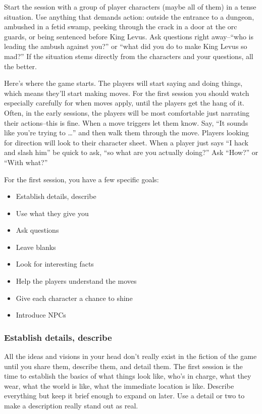 Start the session with a group of player characters (maybe all of them) in a tense situation. Use anything that demands action: outside the entrance to a dungeon, ambushed in a fetid swamp, peeking through the crack in a door at the orc guards, or being sentenced before King Levus. Ask questions right away--``who is leading the ambush against you?'' or ``what did you do to make King Levus so mad?'' If the situation stems directly from the characters and your questions, all the better.


 Here's where the game starts. The players will start saying and doing things, which means they'll start making moves. For the first session you should watch especially carefully for when moves apply, until the players get the hang of it. Often, in the early sessions, the players will be most comfortable just narrating their actions--this is fine. When a move triggers let them know. Say, ``It sounds like you're trying to \ldots '' and then walk them through the move. Players looking for direction will look to their character sheet. When a player just says ``I hack and slash him'' be quick to ask, ``so what are you actually doing?'' Ask ``How?'' or ``With what?''


 For the first session, you have a few specific goals:
\begin{itemize}
\item Establish details, describe
\item Use what they give you
\item Ask questions
\item Leave blanks
\item Look for interesting facts
\item Help the players understand the moves
\item Give each character a chance to shine
\item Introduce NPCs

\end{itemize}
\subsubsection{Establish details, describe}


 All the ideas and visions in your head don't really exist in the fiction of the game until you share them, describe them, and detail them. The first session is the time to establish the basics of what things look like, who's in charge, what they wear, what the world is like, what the immediate location is like. Describe everything but keep it brief enough to expand on later. Use a detail or two to make a description really stand out as real.
